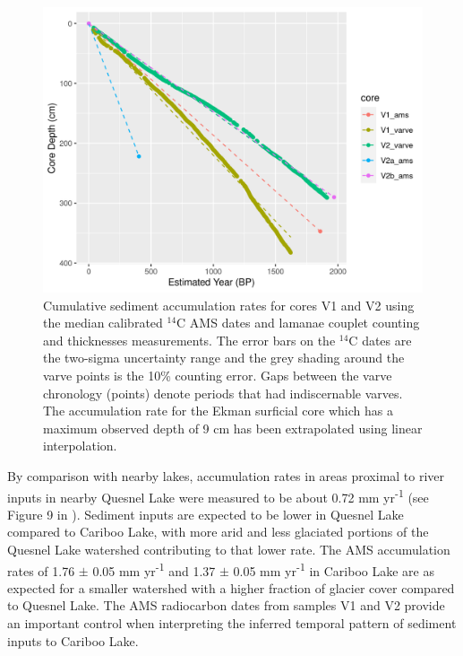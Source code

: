 \documentclass[Royal,times,doublespace,sageh]{sagej}
\begin{document}
\begin{figure}

{\centering \includegraphics[width=1\linewidth]{figs/longcore_cumulative_depth_vs_estimated_year_w_ams_and_varve} 

}

\caption{Cumulative sediment accumulation rates for cores V1 and V2 using the median calibrated $^{14}$C AMS dates and lamanae couplet counting and thicknesses measurements. The error bars on the $^{14}$C dates are the two-sigma uncertainty range and the grey shading around the varve points is the 10\% counting error. Gaps between the varve chronology (points) denote periods that had indiscernable varves. The accumulation rate for the Ekman surficial core which has a maximum observed depth of 9 cm has been extrapolated using linear interpolation.}\label{fig:amsRates}
\end{figure}

By comparison with nearby lakes, accumulation rates in areas proximal to
river inputs in nearby Quesnel Lake were measured to be about 0.72 mm
yr\textsuperscript{-1} (see Figure 9 in \citet{Gilbert2012}). Sediment
inputs are expected to be lower in Quesnel Lake compared to Cariboo
Lake, with more arid and less glaciated portions of the Quesnel Lake
watershed contributing to that lower rate. The AMS accumulation rates of
1.76 \(\pm\) 0.05 mm yr\textsuperscript{-1} and 1.37 \(\pm\) 0.05 mm
yr\textsuperscript{-1} in Cariboo Lake are as expected for a smaller
watershed with a higher fraction of glacier cover compared to Quesnel
Lake. The AMS radiocarbon dates from samples V1 and V2 provide an
important control when interpreting the inferred temporal pattern of
sediment inputs to Cariboo Lake.
\end{document}
